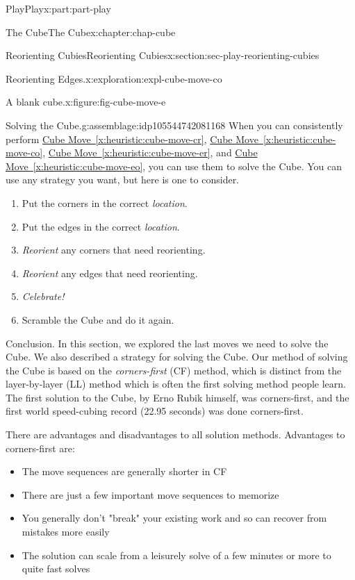 \documentclass[oneside,10pt,]{book}
\newcommand{\xreffont}{\relax}
\numberwithin{equation}{section}
\begin{document}
\begin{partptx}{Play}{}{Play}{}{}{x:part:part-play}
\begin{chapterptx}{The Cube}{}{The Cube}{}{}{x:chapter:chap-cube}
\begin{sectionptx}{Reorienting Cubies}{}{Reorienting Cubies}{}{}{x:section:sec-play-reorienting-cubies}
\begin{exploration}{Reorienting Edges.}{x:exploration:expl-cube-move-co}
\begin{figureptx}{A blank cube.}{x:figure:fig-cube-move-e}{}
\begin{image}{0.25}{0.5}{0.25}
\end{image}%
\tcblower
\end{figureptx}%
\end{exploration}%
\begin{assemblage}{Solving the Cube.}{g:assemblage:idp105544742081168}%
When you can consistently perform \hyperref[x:heuristic:cube-move-cr]{Cube Move~{\xreffont\ref{x:heuristic:cube-move-cr}}}, \hyperref[x:heuristic:cube-move-co]{Cube Move~{\xreffont\ref{x:heuristic:cube-move-co}}}, \hyperref[x:heuristic:cube-move-er]{Cube Move~{\xreffont\ref{x:heuristic:cube-move-er}}}, and \hyperref[x:heuristic:cube-move-eo]{Cube Move~{\xreffont\ref{x:heuristic:cube-move-eo}}}, you can use them to solve the Cube. You can use any strategy you want, but here is one to consider.%
\begin{enumerate}
\item{}Put the corners in the correct \emph{location}.%
\item{}Put the edges in the correct \emph{location}.%
\item{}\emph{Reorient} any corners that need reorienting.%
\item{}\emph{Reorient} any edges that need reorienting.%
\item{}\emph{Celebrate!}%
\item{}Scramble the Cube and do it again.%
\end{enumerate}
%
\end{assemblage}
\begin{conclusion}{Conclusion.}%
In this section, we explored the last moves we need to solve the Cube. We also described a strategy for solving the Cube. Our method of solving the Cube is based on the \emph{corners-first} (CF) method, which is distinct from the layer-by-layer (LL) method which is often the first solving method people learn. The first solution to the Cube, by Erno Rubik himself, was corners-first, and the first world speed-cubing record (22.95 seconds) was done corners-first.%
\par
There are advantages and disadvantages to all solution methods. Advantages to corners-first are:%
\begin{itemize}[label=\textbullet]
\item{}The move sequences are generally shorter in CF%
\item{}There are just a few important move sequences to memorize%
\item{}You generally don't "break" your existing work and so can recover from mistakes more easily%
\item{}The solution can scale from a leisurely solve of a few minutes or more to quite fast solves%

\end{itemize}
\end{conclusion}
\end{sectionptx}
\end{chapterptx}
\end{partptx}
\end{document}
